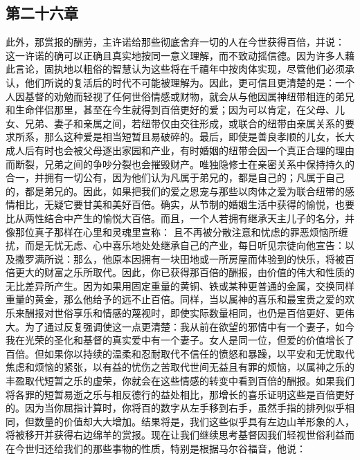 
\subsection{第二十六章}

\par

此外，那赏报的酬劳，主许诺给那些彻底舍弃一切的人在今世获得百倍，并说： 这一许诺的确可以正确且真实地按同一意义理解，而不致动摇信德。因为许多人藉此言论，固执地以粗俗的智慧认为这些将在千禧年中按肉体实现，尽管他们必须承认，他们所说的复活后的时代不可能被理解为。因此，更可信且更清楚的是：一个人因基督的劝勉而轻视了任何世俗情感或财物，就会从与他因属神纽带相连的弟兄和生命伴侣那里，甚至在今生就得到百倍更好的爱；因为可以肯定，在父母、儿女、兄弟、妻子和亲属之间，若纽带仅由交往形成，或联合的纽带由亲属关系的要求所系，那么这种爱是相当短暂且易破碎的。最后，即使是善良孝顺的儿女，长大成人后有时也会被父母逐出家园和产业，有时婚姻的纽带会因一个真正合理的理由而断裂，兄弟之间的争吵分裂也会摧毁财产。唯独隐修士在亲密关系中保持持久的合一，并拥有一切公有，因为他们认为凡属于弟兄的，都是自己的；凡属于自己的，都是弟兄的。因此，如果把我们的爱之恩宠与那些以肉体之爱为联合纽带的感情相比，无疑它要甘美和美好百倍。确实，从节制的婚姻生活中获得的愉悦，也要比从两性结合中产生的愉悦大百倍。而且，一个人若拥有继承天主儿子的名分，并像那位真子那样在心里和灵魂里宣称： 且不再被分散注意和忧虑的罪恶烦恼所缠扰，而是无忧无虑、心中喜乐地处处继承自己的产业，每日听见宗徒向他宣告：以及撒罗满所说：那么，他原本因拥有一块田地或一所房屋而体验到的快乐，将被百倍更大的财富之乐所取代。因此，你已获得那百倍的酬报，由价值的伟大和性质的无比差异所产生。因为如果用固定重量的黄铜、铁或某种更普通的金属，交换同样重量的黄金，那么他给予的远不止百倍。同样，当以属神的喜乐和最宝贵之爱的欢乐来酬报对世俗享乐和情感的蔑视时，即使实际数量相同，也仍是百倍更好、更伟大。为了通过反复强调使这一点更清楚：我从前在欲望的邪情中有一个妻子，如今我在光荣的圣化和基督的真实爱中有一个妻子。女人是同一位，但爱的价值增长了百倍。但如果你以持续的温柔和忍耐取代不信任的愤怒和暴躁，以平安和无忧取代焦虑和烦恼的紧张，以有益的忧伤之苦取代世间无益且有罪的烦恼，以属神之乐的丰盈取代短暂之乐的虚荣，你就会在这些情感的转变中看到百倍的酬报。如果我们将各罪的短暂易逝之乐与相反德行的益处相比，那增长的喜乐证明这些是百倍更好的。因为当你屈指计算时，你将百的数字从左手移到右手，虽然手指的排列似乎相同，但数量的价值却大大增加。结果将是，我们这些似乎具有左边山羊形象的人，将被移开并获得右边绵羊的赏报。现在让我们继续思考基督因我们轻视世俗利益而在今世归还给我们的那些事物的性质，特别是根据马尔谷福音，他说： 